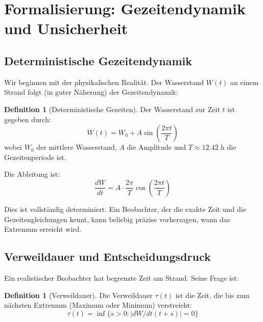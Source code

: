 \documentclass[a4paper, 12pt, twoside, openright]{report}
\theoremstyle{definition}
\newtheorem{definition}[theorem]{Definition}
\theoremstyle{definition}
\begin{document}
\section{Formalisierung: Gezeitendynamik und Unsicherheit}

\subsection{Deterministische Gezeitendynamik}

Wir beginnen mit der physikalischen Realität. Der Wasserstand $W(t)$ an einem Strand folgt (in guter Näherung) der Gezeitendynamik:

\begin{definition}[Deterministische Gezeiten]
    Der Wasserstand zur Zeit $t$ ist gegeben durch:
    \begin{equation}
        W(t) = W_0 + A \sin\left(\frac{2\pi t}{T}\right)
    \end{equation}
    wobei $W_0$ der mittlere Wasserstand, $A$ die Amplitude und $T \approx 12.42$ h die Gezeitenperiode ist.
\end{definition}

Die Ableitung ist:
\begin{equation}
    \frac{dW}{dt} = A \cdot \frac{2\pi}{T} \cos\left(\frac{2\pi t}{T}\right)
\end{equation}

Dies ist vollständig determiniert. Ein Beobachter, der die exakte Zeit und die Gezeitengleichungen kennt, kann beliebig präzise vorhersagen, wann das Extremum erreicht wird.

\subsection{Verweildauer und Entscheidungsdruck}

Ein realistischer Beobachter hat begrenzte Zeit am Strand. Seine Frage ist:

\begin{definition}[Verweildauer]
    Die Verweildauer $\tau(t)$ ist die Zeit, die bis zum nächsten Extremum (Maximum oder Minimum) verstreicht:
    \begin{equation}
        \tau(t) = \inf\{s > 0 : |dW/dt(t+s)| = 0\}
    \end{equation}
\end{definition}
\end{document}
